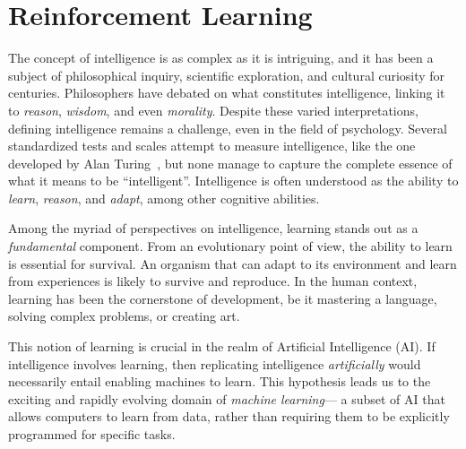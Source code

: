 \chapter{Reinforcement Learning}\label{chap:marl} 

\minitoc%
\newcommand{\RS}{\mathcal{S}}
\newcommand{\RA}{\mathcal{A}}
\newcommand{\RP}{\mathcal{P}}
\newcommand{\RR}{\mathcal{R}}
\newcommand{\RE}{\mathbb{E}}

The concept of intelligence is as complex as it is intriguing, 
 and it has been a subject of philosophical inquiry, 
 scientific exploration, and cultural curiosity for centuries. 
 Philosophers have debated on what constitutes intelligence, 
 linking it to \emph{reason}, \emph{wisdom}, and even \emph{morality}. 
%
Despite these varied interpretations, 
 defining intelligence remains a challenge, 
 even in the field of psychology. 
%
Several standardized tests and scales attempt to measure intelligence,
 like the one developed by Alan Turing~\cite{Turing1950-TURCMA}, 
 but none manage to capture the complete essence of what it means to be ``intelligent''. 
 Intelligence is often understood as the ability to \emph{learn}, \emph{reason}, and \emph{adapt}, among other cognitive abilities.

Among the myriad of perspectives on intelligence, 
 learning stands out as a \emph{fundamental} component. 
 From an evolutionary point of view, 
 the ability to learn is essential for survival. 
 An organism that can adapt to its environment and learn from experiences is likely to survive and reproduce. 
 In the human context, learning has been the cornerstone of development, 
 be it mastering a language, solving complex problems, or creating art.

This notion of learning is crucial in the realm of Artificial Intelligence (AI). 
%
 If intelligence involves learning, 
 then replicating intelligence \emph{artificially} would necessarily entail enabling machines to learn. 
 This hypothesis leads us to the exciting and rapidly evolving domain of \emph{machine learning}---
 a subset of AI that allows computers to learn from data, 
 rather than requiring them to be explicitly programmed for specific tasks.

